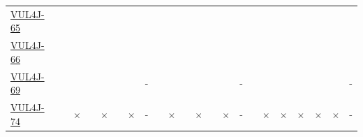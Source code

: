 \begin{table}[!htbp]
{\begin{tabular}{|l|lll|ll|ll||lll|ll|ll||lll|ll|ll|}
		\href{https://github.com/OpenRefine/OpenRefine/commit/e243e73e4064de87a913946bd320fbbe246da656}{VUL4J-65} & \cellcolor{green}\checkmark & \cellcolor{yellow}\halfcheckmark & \cellcolor{green}\checkmark & \cellcolor{green}\checkmark & \cellcolor{green}\checkmark & \cellcolor{green}\checkmark & \cellcolor{green}\checkmark  & \cellcolor{green}\checkmark & 
		\cellcolor{yellow}\halfcheckmark & \cellcolor{green}\checkmark & \cellcolor{green}\checkmark & \cellcolor{green}\checkmark & \cellcolor{green}\checkmark & \cellcolor{green}\checkmark     & \cellcolor{green}\checkmark & \cellcolor{green}\checkmark & \cellcolor{green}\checkmark & \cellcolor{green}\checkmark & \cellcolor{green}\checkmark & \cellcolor{green}\checkmark & \cellcolor{green}\checkmark\\ 
		\href{https://github.com/resteasy/Resteasy/commit/acf15f2a8067f7e4cf5838342cecfa0b78a174fb}{VUL4J-66} & \cellcolor{green}\checkmark & \cellcolor{green}\checkmark & \cellcolor{green}\checkmark & \cellcolor{green}\checkmark & \cellcolor{green}\checkmark & \cellcolor{green}\checkmark & \cellcolor{green}\checkmark  & \cellcolor{green}\checkmark & \cellcolor{green}\checkmark & \cellcolor{green}\checkmark & \cellcolor{green}\checkmark & \cellcolor{green}\checkmark & \cellcolor{green}\checkmark & \cellcolor{green}\checkmark     & \cellcolor{green}\checkmark & \cellcolor{green}\checkmark & \cellcolor{green}\checkmark & \cellcolor{green}\checkmark & \cellcolor{green}\checkmark & \cellcolor{green}\checkmark & \cellcolor{green}\checkmark\\ 
		\href{https://github.com/spring-projects/spring-framework/commit/e2d6e709c3c65a4951eb096843ee75d5200cfcad}{VUL4J-69} & \cellcolor{green}\checkmark & \cellcolor{yellow}\halfcheckmark & \cellcolor{green}\checkmark & \cellcolor{green}\checkmark & \cellcolor{green}\checkmark & \cellcolor{green}\checkmark & \cellcolor{lightgray}-  & \cellcolor{green}\checkmark & \cellcolor{green}\checkmark & \cellcolor{green}\checkmark & \cellcolor{green}\checkmark & \cellcolor{green}\checkmark & \cellcolor{green}\checkmark & \cellcolor{lightgray}-     & \cellcolor{green}\checkmark & \cellcolor{green}\checkmark & \cellcolor{green}\checkmark & \cellcolor{green}\checkmark & \cellcolor{green}\checkmark & \cellcolor{green}\checkmark & \cellcolor{lightgray}-\\ 
		\href{https://github.com/spring-projects/spring-security/commit/1304c958bf9c38940082f3ad1558d413ed82f2b}{VUL4J-74} & \cellcolor{green}\checkmark & \cellcolor{red}$\times$ & \cellcolor{green}\checkmark & \cellcolor{red}$\times$ & \cellcolor{green}\checkmark & \cellcolor{red}$\times$ & \cellcolor{lightgray}-  & \cellcolor{green}\checkmark & \cellcolor{red}$\times$ & \cellcolor{green}\checkmark & \cellcolor{red}$\times$ & \cellcolor{green}\checkmark & \cellcolor{red}$\times$ & \cellcolor{lightgray}-     & \cellcolor{green}\checkmark & \cellcolor{red}$\times$ & \cellcolor{red}$\times$ & \cellcolor{red}$\times$ & \cellcolor{red}$\times$ & \cellcolor{red}$\times$ & \cellcolor{lightgray}-\\ 

\end{tabular}}
\end{table}
